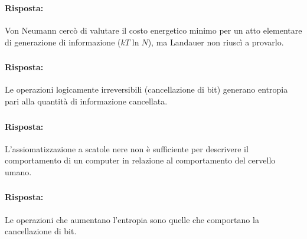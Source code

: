 \subsubsection{}


\paragraph{Risposta:} Von Neumann cercò di valutare il costo energetico minimo 
per un atto elementare di generazione di informazione ($kT \ln N$), ma Landauer
non riuscì a provarlo.

\subsubsection{}


\paragraph{Risposta:} Le operazioni logicamente irreversibili (cancellazione di bit) 
generano entropia pari alla quantità di informazione cancellata.

\subsubsection{}


\paragraph{Risposta:} L'assiomatizzazione a scatole nere non è sufficiente per descrivere
il comportamento di un computer in relazione al comportamento del cervello umano.

\subsubsection{}


\paragraph{Risposta:} Le operazioni che aumentano l'entropia sono quelle che comportano la cancellazione di bit.

